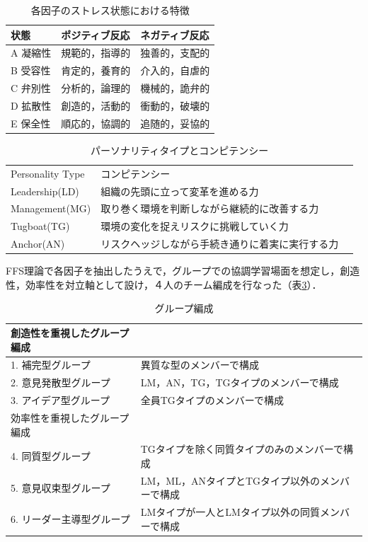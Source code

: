 \documentclass{funthesis}
\begin{document}
\begin{table}[h]
\begin{center}
  \begin{tabular}{lll} \hline
    状態 & ポジティブ反応 & ネガティブ反応\tabularnewline \hline
    A 凝縮性& 規範的，指導的 & 
    独善的，支配的\tabularnewline
    B 受容性 &肯定的，養育的 & 
    介入的，自虐的\tabularnewline
    C 弁別性&分析的，論理的 &
    機械的，詭弁的\tabularnewline
    D 拡散性&創造的，活動的 &
    衝動的，破壊的\tabularnewline
    E 保全性&順応的，協調的 &
    追随的，妥協的\tabularnewline
    \hline
  \end{tabular}
  \caption{各因子のストレス状態における特徴}
  \label{FFS理論}
  \end{center}
\end{table}

\begin{table}[h]
\begin{center}
  \begin{tabular}{lll} \hline
    Personality Type &  コンピテンシー\tabularnewline
   Leadership(LD)& 組織の先頭に立って変革を進める力  \tabularnewline
    Management(MG) & 取り巻く環境を判断しながら継続的に改善する力 \tabularnewline
    Tugboat(TG)& 環境の変化を捉えリスクに挑戦していく力\tabularnewline
    Anchor(AN)&リスクヘッジしながら手続き通りに着実に実行する力 \tabularnewline
    \hline
  \end{tabular}
  \caption{パーソナリティタイプとコンピテンシー}
  \label{FFS理論2}
  \end{center}
\end{table}

FFS理論で各因子を抽出したうえで，グループでの協調学習場面を想定し，創造性，効率性を対立軸として設け，４人のチーム編成を行なった（表\ref{FFS理論3}）．

\begin{table}[h]
\begin{center}
  \begin{tabular}{ll} \hline
    創造性を重視したグループ編成\tabularnewline \hline
   1. 補完型グループ& 異質な型のメンバーで構成  \tabularnewline
   2. 意見発散型グループ & LM，AN，TG，TGタイプのメンバーで構成 \tabularnewline
    3. アイデア型グループ& 全員TGタイプのメンバーで構成\tabularnewline \hline
    効率性を重視したグループ編成 \tabularnewline \hline
    4. 同質型グループ& TGタイプを除く同質タイプのみのメンバーで構成  \tabularnewline
    5. 意見収束型グループ & LM，ML，ANタイプとTGタイプ以外のメンバーで構成 \tabularnewline
    6. リーダー主導型グループ&LMタイプが一人とLMタイプ以外の同質メンバーで構成\tabularnewline
    \hline
  \end{tabular}
  \caption{グループ編成}
  \label{FFS理論3}
  \end{center}
\end{table}
\end{document}
